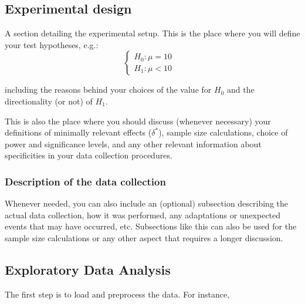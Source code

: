 \documentclass[
]{article}
\newenvironment{Shaded}{\begin{snugshade}}{\end{snugshade}}
\newcommand{\ControlFlowTok}[1]{\textcolor[rgb]{0.13,0.29,0.53}{\textbf{#1}}}
\newcommand{\DecValTok}[1]{\textcolor[rgb]{0.00,0.00,0.81}{#1}}
\newcommand{\FunctionTok}[1]{\textcolor[rgb]{0.13,0.29,0.53}{\textbf{#1}}}
\newcommand{\NormalTok}[1]{#1}
\newcommand{\OtherTok}[1]{\textcolor[rgb]{0.56,0.35,0.01}{#1}}
\newcommand{\SpecialCharTok}[1]{\textcolor[rgb]{0.81,0.36,0.00}{\textbf{#1}}}
\newcommand{\StringTok}[1]{\textcolor[rgb]{0.31,0.60,0.02}{#1}}
\begin{document}
\subsection{Experimental design}\label{experimental-design}

A section detailing the experimental setup. This is the place where you
will define your test hypotheses, e.g.:
\[\begin{cases} H_0: \mu = 10&\\H_1: \mu<10\end{cases}\]

including the reasons behind your choices of the value for \(H_0\) and
the directionality (or not) of \(H_1\).

This is also the place where you should discuss (whenever necessary)
your definitions of minimally relevant effects (\(\delta^*\)), sample
size calculations, choice of power and significance levels, and any
other relevant information about specificities in your data collection
procedures.

\subsubsection{Description of the data
collection}\label{description-of-the-data-collection}

Whenever needed, you can also include an (optional) subsection
describing the actual data collection, how it was performed, any
adaptations or unexpected events that may have occurred, etc.
Subsections like this can also be used for the sample size calculations
or any other aspect that requires a longer discussion.

\subsection{Exploratory Data Analysis}\label{exploratory-data-analysis}

The first step is to load and preprocess the data. For instance,

\begin{Shaded}
\end{Shaded}
\end{document}
